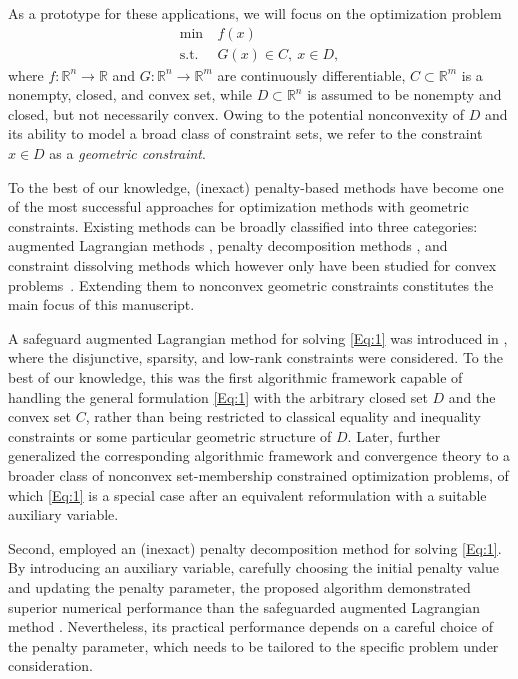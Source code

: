 \documentclass[11pt,a4paper,reqno]{amsart}
\begin{document}
{%
As a prototype for these applications, we will focus on the optimization problem
\begin{equation}\label{Eq:1}\tag{P}
\begin{aligned}
  \min \ &f(x)  \\ 
  \text{s.t.} \ & G(x)\in C, \ x\in D,
\end{aligned}
\end{equation}
where $f:\mathbb R^n \to \mathbb R$ and $G: \mathbb R^n\to \mathbb R^m$ are continuously differentiable, $C \subset \mathbb R^m$ is a nonempty, closed, and convex set, while $D\subset \mathbb R^n$ is assumed to be nonempty and closed, but not necessarily convex. Owing to the potential nonconvexity of $D$ and its ability to model a broad class of constraint sets, we refer to the constraint $x\in D$
as a \emph{geometric constraint}. 

To the best of our knowledge, (inexact) penalty-based methods have become one of the most successful approaches for %
optimization methods with geometric constraints.
Existing methods can be broadly classified into three categories: augmented Lagrangian methods \cite{de2023constrained, jia2023augmented}, penalty decomposition methods \cite{kanzow2023inexact}, and constraint dissolving methods which however only have been studied for convex problems~\cite{xiao2024dissolving,xiao2026exact}. Extending them to nonconvex geometric constraints constitutes the main focus of this manuscript.

A safeguard augmented Lagrangian method for solving \eqref{Eq:1} was introduced in \cite{jia2023augmented}, where the disjunctive, sparsity, and low-rank constraints were considered. To the best of our knowledge, this was the first algorithmic framework capable of handling the general formulation \eqref{Eq:1} with the arbitrary closed set $D$ and the convex set $C$, rather than being restricted to classical equality and inequality constraints or some particular geometric structure of $D$. Later, \cite{de2023constrained} further generalized the corresponding algorithmic framework and convergence theory to a broader class of nonconvex set-membership constrained optimization problems, of which \eqref{Eq:1} is a special case after an equivalent reformulation with a suitable auxiliary variable.

Second, \cite{kanzow2023inexact} employed an (inexact) penalty decomposition method for solving \eqref{Eq:1}. By introducing an auxiliary variable, carefully choosing the initial penalty value and updating the penalty parameter, the proposed algorithm demonstrated superior numerical performance than the safeguarded augmented Lagrangian method \cite{jia2023augmented}. Nevertheless, its practical performance depends on a careful choice of the penalty parameter, which needs to be tailored to the specific problem under consideration.

}
\end{document}
